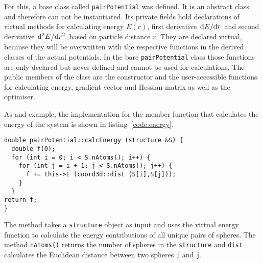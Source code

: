 For this, a base class called \verb|pairPotential| was defined. It is an
abstract class and therefore can not be instantiated. Its private fields hold
declarations of virtual methods for calculating energy $E(r)$, first derivative
$\dv*{E}{r}$ and second derivative $\dv*[2]{E}{r}$ based on particle distance
$r$. They are declared virtual, because they will be overwritten with the
respective functions in the derived classes of the actual potentials. In the
bare \verb|pairPotential| class those functions are only declared but never
defined and cannot be used for calculations. The public members of the class are
the constructor and the user-accessible functions for calculating energy,
gradient vector and Hessian matrix as well as the optimiser.

As and example, the \Cpp implementation for the member function that calculates
the energy of the system is shown in listing~\ref{code:energy}.
%
\begin{lstlisting}[caption={Implementation of the redundant part of the energy calculation.},label=code:energy,float=htb]
double pairPotential::calcEnergy (structure &S) {
  double f(0);
  for (int i = 0; i < S.nAtoms(); i++) {
    for (int j = i + 1; j < S.nAtoms(); j++) {
      f += this->E (coord3d::dist (S[i],S[j]));
    }
  }
return f;
}
\end{lstlisting}
%
The method takes a \verb|structure| object as input and uses the virtual energy
function to calculate the energy contributions of all unique pairs of spheres.
The method \texttt{nAtoms()} returns the number of spheres in the
\texttt{structure} and \texttt{dist} calculates the Euclidean distance between
two spheres \texttt{i} and \texttt{j}.

